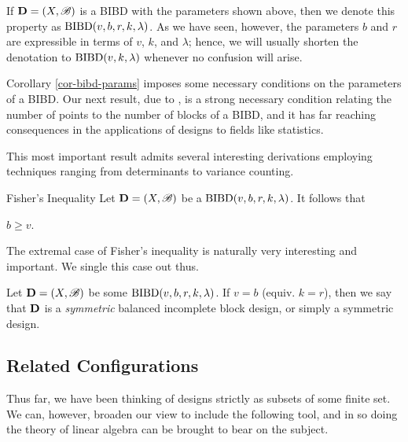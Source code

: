 \documentclass[../../../main]{subfiles}
\begin{document}
 If $\mathbf{D}=(X,\mathscr{B})$ is a BIBD with the parameters shown above, then we denote this property as $\text{BIBD}(v,b,r,k,\lambda)$. As we have seen, however, the parameters $b$ and $r$ are expressible in terms of $v$, $k$, and $\lambda$; hence, we will usually shorten the denotation to $\text{BIBD}(v,k,\lambda)$ whenever no confusion will arise.  

 Corollary \ref{cor-bibd-params} imposes some necessary conditions on the parameters of a BIBD. Our next result, due to \cite{fisher-inequality}, is a strong necessary condition relating the number of points to the number of blocks of a BIBD, and it has far reaching consequences in the applications of designs to fields like statistics.

 This most important result admits several interesting derivations employing
 techniques ranging from determinants to variance counting.

 \begin{namedthm}{Fisher's Inequality}
   Let $\mathbf{D}=(X,\mathscr{B})$ be a $\text{BIBD}(v,b,r,k,\lambda)$. It follows that 
   \begin{defenum}
   \item\label{fisher} $b \geq v$.
   \end{defenum}
 \end{namedthm}

 The extremal case of Fisher's inequality is naturally very interesting and important. We single this case out thus.

 \begin{defin}\label{square-design}
   Let $\mathbf{D}=(X,\mathscr{B})$ be some $\text{BIBD}(v,b,r,k,\lambda)$. If $v = b$ (equiv. $k =
   r$), then we say that $\mathbf{D}$ is a {\it symmetric} balanced incomplete block
   design, or simply a symmetric design.
 \end{defin}

 \dinkus

 \subsection{Related Configurations}
 
Thus far, we have been thinking of designs strictly as subsets of some finite set. We can, however, broaden our view to include the following tool, and in so doing the theory of linear algebra can be brought to bear on the subject.
\end{document}
